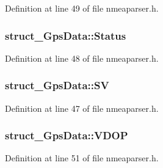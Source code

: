 Definition at line 49 of file nmeaparser.\-h.

\hypertarget{group___g_p_s_gadget_plugin_gafecfb74415dbfe5f6bc3c950183eb3b2}{
\subsubsection[{Status}]{ struct\-\_\-\-Gps\-Data\-::\-Status}}\label{group___g_p_s_gadget_plugin_gafecfb74415dbfe5f6bc3c950183eb3b2}


Definition at line 48 of file nmeaparser.\-h.

\hypertarget{group___g_p_s_gadget_plugin_gad4c8228c92e708ffbf1205af7955a571}{
\subsubsection[{S\-V}]{ struct\-\_\-\-Gps\-Data\-::\-S\-V}}\label{group___g_p_s_gadget_plugin_gad4c8228c92e708ffbf1205af7955a571}


Definition at line 47 of file nmeaparser.\-h.

\hypertarget{group___g_p_s_gadget_plugin_ga0c803c003d3d1261b1519a4b1f561ebe}{
\subsubsection[{V\-D\-O\-P}]{ struct\-\_\-\-Gps\-Data\-::\-V\-D\-O\-P}}\label{group___g_p_s_gadget_plugin_ga0c803c003d3d1261b1519a4b1f561ebe}


Definition at line 51 of file nmeaparser.\-h.



